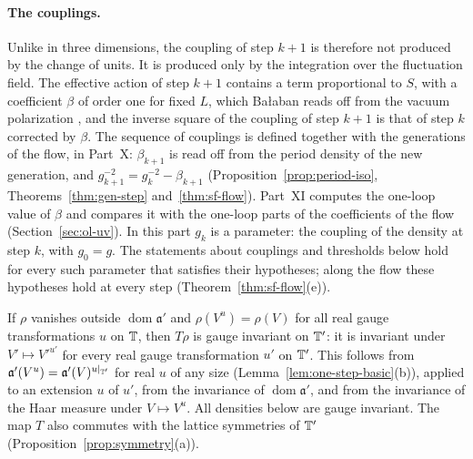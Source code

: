 \paragraph{The couplings.} Unlike in three dimensions, the coupling of step $k+1$ is therefore not produced by the change of units. It is produced only by the integration over the fluctuation field. The effective action of step $k+1$ contains a term proportional to $S$, with a coefficient $\beta$ of order one for fixed $L$, which Ba\l aban reads off from the vacuum polarization \cite[(1.20)--(1.22)]{BalYM4I}, and the inverse square of the coupling of step $k+1$ is that of step $k$ corrected by $\beta$. The sequence of couplings is defined together with the generations of the flow, in Part~X: $\beta_{k+1}$ is read off from the period density of the new generation, and $g_{k+1}^{-2}=g_k^{-2}-\beta_{k+1}$ (Proposition~\ref{prop:period-iso}, Theorems~\ref{thm:gen-step} and~\ref{thm:sf-flow}). Part~XI computes the one-loop value of $\beta$ and compares it with the one-loop parts of the coefficients of the flow (Section~\ref{sec:ol-uv}). In this part $g_k$ is a parameter: the coupling of the density at step $k$, with $g_0=g$. The statements about couplings and thresholds below hold for every such parameter that satisfies their hypotheses; along the flow these hypotheses hold at every step (Theorem~\ref{thm:sf-flow}(e)).

If $\rho$ vanishes outside $\operatorname{dom}\mathfrak a'$ and $\rho(V^u)=\rho(V)$ for all real gauge transformations $u$ on $\mathbb T$, then $T\rho$ is gauge invariant on $\mathbb T'$: it is invariant under $V'\mapsto V'^{u'}$ for every real gauge transformation $u'$ on $\mathbb T'$. This follows from $\mathfrak a'(V^u)=\mathfrak a'(V)^{u|_{\mathbb T'}}$ for real $u$ of any size (Lemma~\ref{lem:one-step-basic}(b)), applied to an extension $u$ of $u'$, from the invariance of $\operatorname{dom}\mathfrak a'$, and from the invariance of the Haar measure under $V\mapsto V^u$. All densities below are gauge invariant. The map $T$ also commutes with the lattice symmetries of $\mathbb T'$ (Proposition~\ref{prop:symmetry}(a)).

